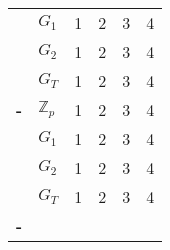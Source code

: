 \begin{longtabu}{| >{\bfseries\centering}p{2cm} | >{\bfseries\centering}p{0.5cm} | X[c] X[c] X[c] X[c] |}
	& $G_1$ \newline & 1 & 2 & 3 & 4 \\
	& $G_2$ \newline & 1 & 2 & 3 & 4 \\
	& $G_T$ \newline & 1 & 2 & 3 & 4 \\
	\tabucline[1pt]-
	 \newline & $\mathbb{Z}_p$ & 1 & 2 & 3 & 4 \\
	& $G_1$ \newline & 1 & 2 & 3 & 4 \\
	& $G_2$ \newline & 1 & 2 & 3 & 4 \\
	& $G_T$ \newline & 1 & 2 & 3 & 4 \\
	\tabucline[3pt]-
\end{longtabu}